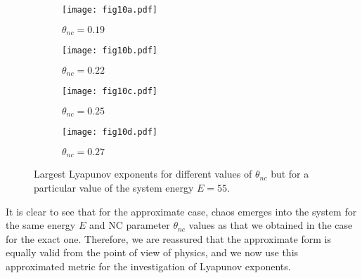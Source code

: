 \documentclass[aps,prd,showpacs,nofootinbib,floats,floatfix,preprintnumbers,groupedaddress,twocolumn]{revtex4-1}
\begin{document}
\begin{figure}[hbt!]
	\centering
	\begin{subfigure}[b]{0.6\linewidth}
		\texttt{[image: fig10a.pdf]} \caption{$\theta_{nc}=0.19$}
	\end{subfigure}
	\begin{subfigure}[b]{0.6\linewidth}
		\texttt{[image: fig10b.pdf]} \caption{$\theta_{nc}=0.22$}
	\end{subfigure}
	\begin{subfigure}[b]{0.6\linewidth}
		\texttt{[image: fig10c.pdf]} \caption{$\theta_{nc}=0.25$}
	\end{subfigure}
	\begin{subfigure}[b]{0.6\linewidth}
		\texttt{[image: fig10d.pdf]} \caption{$\theta_{nc}=0.27$}
	\end{subfigure}
	\caption{Largest Lyapunov exponents for different values of $\theta_{nc}$ but for a particular value of the system energy $E=55$.}
	\label{fig:10}
\end{figure} 	 
%
%
%
%
\par\noindent
It is clear to see  that for the approximate case, chaos emerges into the system for the same energy $E$ and NC parameter $\theta_{nc}$ values as that we obtained in the case for the exact one. Therefore, we are reassured that the approximate form is equally valid from the point of view of physics, and we now use this approximated metric for the investigation of  Lyapunov exponents.
%
%
%
\end{document}
